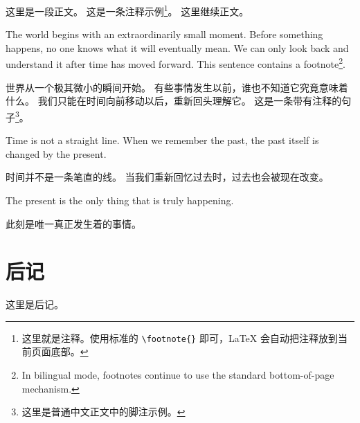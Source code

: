 \cleardoublepage

\tableofcontents

\mainmatter

这里是一段正文。
这是一条注释示例\footnote{这里就是注释。使用标准的 \texttt{\textbackslash footnote\{\}} 即可，LaTeX 会自动把注释放到当前页面底部。}。
这里继续正文。
\vspace{1em}

\ifbilingual
    \begin{bilingualtext}
           {The world begins with an extraordinarily small moment.}
           {Before something happens, no one knows what it will eventually mean.}
           {We can only look back and understand it after time has moved forward.}
           {This sentence contains a footnote\footnote{In bilingual mode, footnotes continue to use the standard bottom-of-page mechanism.}.}
    \end{bilingualtext}
\else
    世界从一个极其微小的瞬间开始。
    有些事情发生以前，谁也不知道它究竟意味着什么。
    我们只能在时间向前移动以后，重新回头理解它。
    这是一条带有注释的句子\footnote{这里是普通中文正文中的脚注示例。}。
\fi

\ifbilingual
    \begin{bilingualtext}
           {Time is not a straight line.}
           {When we remember the past, the past itself is changed by the present.}
    \end{bilingualtext}
\else
    时间并不是一条笔直的线。
    当我们重新回忆过去时，过去也会被现在改变。
\fi
{}
\ifbilingual
    \begin{bilingualtext}
           {The present is the only thing that is truly happening.}
    \end{bilingualtext}
\else
    此刻是唯一真正发生着的事情。
\fi

\backmatter
\chapter*{后记}
这里是后记。